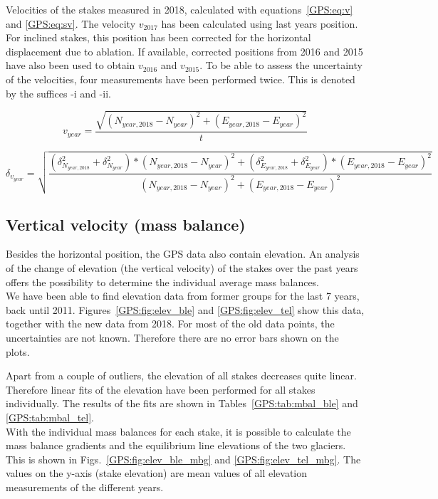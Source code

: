 \begin{table}[H]
	\caption{Velocities of the stakes measured in 2018, calculated with equations~\ref{GPS:eq:v} and \ref{GPS:eq:sv}.
	The velocity $v_{2017}$ has been calculated using last years position.
	For inclined stakes, this position has been corrected for the horizontal displacement due to ablation.
	If available, corrected positions from 2016 and 2015 have also been used to obtain $v_{2016}$ and $v_{2015}$.
	To be able to assess the uncertainty of the velocities, four measurements have been performed twice.
	This is denoted by the suffices -i and -ii.}
	\centering
	
	\label{GPS:tab:vel_tab}
\end{table}

\begin{equation}
\label{GPS:eq:v}
v_{year} = \frac{\sqrt{(N_{year, 2018}-N_{year})^2+(E_{year, 2018} - E_{year})^2}}{t}
\end{equation}

\begin{equation}
\label{GPS:eq:sv}
\delta_{v_{year}} = \sqrt{\frac{
(\delta_{N_{year, 2018}}^2 + \delta_{N_{year}}^2) * (N_{year, 2018}-N_{year})^2 +
(\delta_{E_{year, 2018}}^2 + \delta_{E_{year}}^2) * (E_{year, 2018}-E_{year})^2}
{(N_{year, 2018} - N_{year})^2+ (E_{year, 2018} - E_{year})^2}}
\end{equation}


\subsection{Vertical velocity (mass balance)} \label{GPS:subsec:maba}

Besides the horizontal position, the GPS data also contain elevation.
An analysis of the change of elevation (the vertical velocity) of the stakes over the past years offers the possibility to determine the individual average mass balances.\\
We have been able to find elevation data from former groups for the last 7 years,
back until 2011.
Figures~\ref{GPS:fig:elev_ble} and \ref{GPS:fig:elev_tel} show this data,
together with the new data from 2018.
For most of the old data points, the uncertainties are not known.
Therefore there are no error bars shown on the plots.

Apart from a couple of outliers, the elevation of all stakes decreases quite linear.
Therefore linear fits of the elevation have been performed for all stakes individually.
The results of the fits are shown in Tables~\ref{GPS:tab:mbal_ble} and \ref{GPS:tab:mbal_tel}.\\
With the individual mass balances for each stake,
it is possible to calculate the mass balance gradients and the equilibrium line elevations of the two glaciers.
This is shown in Figs.~\ref{GPS:fig:elev_ble_mbg} and \ref{GPS:fig:elev_tel_mbg}.
The values on the y-axis (stake elevation) are mean values of all elevation measurements of the different years.

